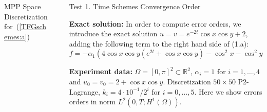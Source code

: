 \documentclass[final]{beamer}
\newlength{\sepwid}
\newlength{\onecolwid}
\begin{document}
\begin{frame}[t]
\begin{columns}[t]
\begin{column}{\onecolwid}
\begin{block}{MPP Space Discretization for~(\ref{TFGschemes:a})}
      \end{block}

    \end{column}



    \begin{column}{\sepwid}  \end{column}

    \vspace*{0.5cm}

    \begin{column}{\onecolwid} %

      \begin{block}{Test 1. Time Schemes Convergence Order}

        {\small
          \textbf{Exact solution:} In order to compute error orders, we introduce the exact solution $u=v=e^{-2t}\cos{x}\cos{y}+2$, adding the following term to the right hand side of (1.a):
          $$f=-\alpha_1 (4\cos{x}\cos{y}(e^{2t}+\cos{x}\cos{y})-\cos^2{x}-\cos^2{y})e^{-4t}.$$

          \textbf{Experiment data:} $\Omega=[0,\pi]^2\subset\mathbb{R}^2$, $\alpha_i=1$ for $i=1,\dots,4$ and $u_0=v_0=2+\cos{x}\cos{y}$. Discretization $50 \times 50$ P2-Lagrange, $k_i=4\cdot10^{-1}/2^i$ for $i=0,\dots,5$. Here we show errors orders in norm $L^2(0,T; H^1(\Omega))$.

}
\end{block}
\end{column}
\end{columns}
\end{frame}
\end{document}
